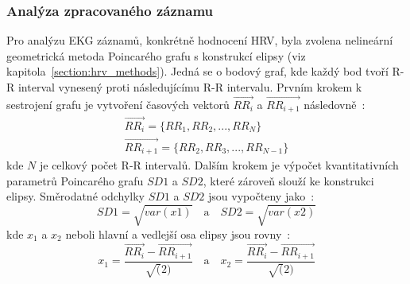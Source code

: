\subsubsection{Analýza zpracovaného záznamu}
\label{section:analysis}
Pro analýzu EKG záznamů, konkrétně hodnocení HRV, byla zvolena nelineární
geometrická metoda Poincarého grafu s konstrukcí elipsy (viz
kapitola~\ref{section:hrv_methods}). Jedná se o bodový graf, kde každý bod tvoří
R-R interval vynesený proti následujícímu R-R intervalu. Prvním krokem k
sestrojení grafu je vytvoření časových vektorů $\overrightarrow{RR_i}$ a
$\overrightarrow{RR_{i+1}}$ následovně~\cite{Mazhar2007}:
\begin{gather}
    \overrightarrow{RR_i} = \{RR_1, RR_2,...,RR_{N}\} \\
    \overrightarrow{RR_{i+1}} = \{RR_2, RR_3,...,RR_{N-1}\}
\end{gather}
kde $N$ je celkový počet R-R intervalů. Dalším krokem je výpočet kvantitativních
parametrů Poincarého grafu $SD1$ a $SD2$, které zároveň slouží ke konstrukci
elipsy. Směrodatné odchylky $SD1$ a $SD2$ jsou vypočteny jako~\cite{Mazhar2007}:
\begin{equation}
    SD1 = \sqrt{var(x1)}
    \quad \textrm{a} \quad
    SD2 = \sqrt{var(x2)}
\end{equation}
kde $x_1$ a $x_2$ neboli hlavní a vedlejší osa elipsy jsou
rovny~\cite{Mazhar2007}:
\begin{equation}
    x_1 = \frac{\overrightarrow{RR_i}-\overrightarrow{RR_{i+1}}}{\sqrt(2)}
    \quad \textrm{a} \quad
    x_2 = \frac{\overrightarrow{RR_i}-\overrightarrow{RR_{i+1}}}{\sqrt(2)}
\end{equation}

